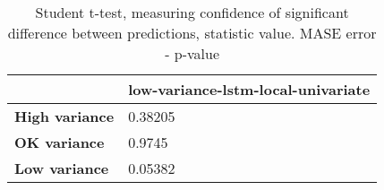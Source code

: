\begin{table}[h]
\centering
\caption{Student t-test, measuring confidence of significant difference between predictions, statistic value. MASE error - p-value}
\label{table:ttest-p-values-variance-experiments-MASE}
\begin{tabular}{ll}
\toprule
{} & low-variance-lstm-local-univariate \\
\midrule
\textbf{High variance} &                            0.38205 \\
\textbf{OK variance  } &                             0.9745 \\
\textbf{Low variance } &                            0.05382 \\
\bottomrule
\end{tabular}
\end{table}
